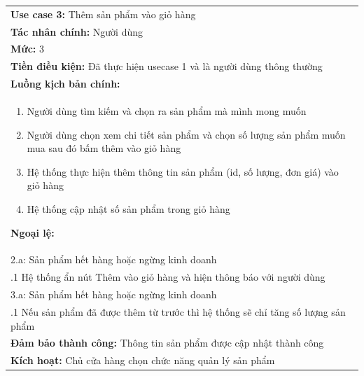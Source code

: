 \begin{center}
\begin{tabularx}{\linewidth}{|X|}
\cline{1-2}
    \textbf{Use case 3:} Thêm sản phẩm vào giỏ hàng\\
    \textbf{Tác nhân chính:} Người dùng\\
    \textbf{Mức:} 3\\
    \textbf{Tiền điều kiện:} Đã thực hiện usecase 1 và là người dùng thông thường\\
    \textbf{Luồng kịch bản chính:}\\
    \begin{enumerate}
        \vspace{-2em}
        \itemsep-0.5em
        \item Người dùng tìm kiếm và chọn ra sản phẩm mà mình mong muốn
        \item Người dùng chọn xem chi tiết sản phẩm và chọn số lượng sản phẩm muốn mua sau đó bấm thêm vào giỏ hàng
        \item Hệ thống thực hiện thêm thông tin sản phẩm  (id, số lượng, đơn giá) vào giỏ hàng
        \item Hệ thống cập nhật số sản phẩm trong giỏ hàng
        \vspace{-1em}
    \end{enumerate}
    \textbf{Ngoại lệ:}\\
    \hspace{1em}2.a: Sản phẩm hết hàng hoặc ngừng kinh doanh\\
    \hspace{2.5em}.1 Hệ thống ẩn nút Thêm vào giỏ hàng và hiện thông báo với người dùng\\
    \hspace{1em}3.a: Sản phẩm hết hàng hoặc ngừng kinh doanh\\
    \hspace{2.5em}.1 Nếu sản phẩm đã được thêm từ trước thì hệ thống sẽ chỉ tăng số lượng sản phẩm\\
    \textbf{Đảm bảo thành công:} Thông tin sản phẩm được cập nhật thành công\\
    \textbf{Kích hoạt:} Chủ cửa hàng chọn chức năng quản lý sản phẩm
\cline{1-2}
\end{tabularx}
\end{center}

